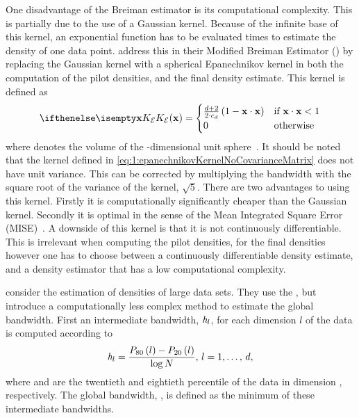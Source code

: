	One disadvantage of the Breiman estimator is its computational complexity. This is partially due to the use of a Gaussian kernel. Because of the infinite base of this kernel, an exponential function has to be evaluated \varNumPatterns times to estimate the density of one data point.
	\textcite{wilkinson1995dataplot} address this in their Modified Breiman Estimator (\mbe) by replacing the Gaussian kernel with a spherical Epanechnikov kernel in both the computation of the pilot densities, and the final density estimate. This kernel is defined as
	\begin{equation}\label{eq:1:epanechnikovKernelNoCovarianceMatrix}
		\varKernel[\varEpan]{\varPattern} =
		\begin{cases}
			\frac{\varDim + 2}{2\cdot\varUnitSphere{\varDim}} \left( 1 - \varPattern \cdot \varPattern \right) & \text{if } \varPattern \cdot \varPattern < 1\\
			0 & \text{otherwise}
		\end{cases}
	\end{equation}
	 where \varUnitSphere{\varDim} denotes the volume of the \varDim-dimensional unit sphere~\cite{epanechnikov1969non}. It should be noted that the kernel defined in \cref{eq:1:epanechnikovKernelNoCovarianceMatrix} does not have unit variance. This can be corrected by multiplying the bandwidth \varBandwidth with the square root of the variance of the kernel, \mbox{\ie $\sqrt{5}$}. There are two advantages to using this kernel. Firstly it is computationally significantly cheaper than the Gaussian kernel. Secondly it is optimal in the sense of the Mean Integrated Square Error (MISE)~\cite{epanechnikov1969non}. A downside of this kernel is that it is not continuously differentiable. This is irrelevant when computing the pilot densities, for the final densities however one has to choose between a continuously differentiable density estimate, and a density estimator that has a low computational complexity.

	\textcite{ferdosi2011comparison} consider the estimation of densities of large data sets. They use the \mbe, but introduce a computationally less complex method to estimate the global bandwidth. First an intermediate bandwidth, $\mathit{h}_{l}$, for each dimension $l$ of the data is computed according to
	\begin{equation}\label{eq:1:ferdosiGeneralBandwidth}
			\mathit{h}_{l} = \frac{P_{80}\left( l \right) - P_{20}\left( l \right)}{\log N}, \, l = 1, \dotsc,\, d,
		\end{equation}
	where  and  are the twentieth and eightieth percentile of the data in dimension \itDim, respectively. The global bandwidth, \varBandwidth, is defined as the minimum of these intermediate bandwidths.

